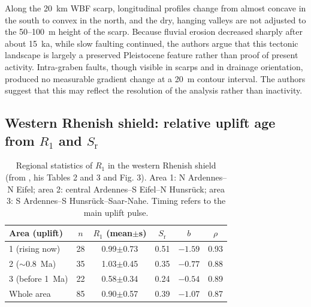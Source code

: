 \documentclass[10pt,a4paper,twocolumn]{article}
\begin{document}
Along the 20~km WBF scarp, longitudinal profiles change from almost concave in the south to convex in
the north, and the dry, hanging valleys are not adjusted to the 50--100~m height of the scarp. Because
fluvial erosion decreased sharply after about 15~ka, while slow faulting continued, the authors argue
that this tectonic landscape is largely a preserved Pleistocene feature rather than proof of present
activity. Intra-graben faults, though visible in scarps and in drainage orientation, produced no
measurable gradient change at a 20~m contour interval. The authors suggest that this may reflect the
resolution of the analysis rather than inactivity.

\subsection{Western Rhenish shield: relative uplift age from $R_1$ and $S_\mathrm{r}$}
\label{sec:wrs}

\begin{table}[t]
\centering
\caption{Regional statistics of $R_1$ in the western Rhenish shield (from \citealp{Demoulin2011},
his Tables 2 and 3 and Fig. 3). Area 1: N Ardennes--N Eifel; area 2: central Ardennes--S Eifel--N
Hunsrück; area 3: S Ardennes--S Hunsrück--Saar-Nahe. Timing refers to the main uplift pulse.}
\label{tab:d11}
\scriptsize
\setlength{\tabcolsep}{3pt}
\begin{tabular}{@{}lccccc@{}}
\toprule
\textbf{Area} (uplift) & $n$ & $R_1$ (mean$\pm$s) & $S_\mathrm{r}$ & $b$ & $\rho$\\
\midrule
1 (rising now) & 28 & 0.99$\pm$0.73 & 0.51 & $-1.59$ & 0.93\\
2 ($\sim$0.8~Ma) & 35 & 1.03$\pm$0.45 & 0.35 & $-0.77$ & 0.88\\
3 (before 1~Ma) & 22 & 0.58$\pm$0.34 & 0.24 & $-0.54$ & 0.89\\
Whole area & 85 & 0.90$\pm$0.57 & 0.39 & $-1.07$ & 0.87\\
\bottomrule
\end{tabular}
\end{table}
\end{document}
